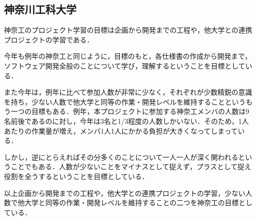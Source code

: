 \subsection{神奈川工科大学}
\par
神奈工のプロジェクト学習の目標は企画から開発までの工程や，他大学との連携プロジェクトの学習である．
\par
今年も例年の神奈工と同じように，目標のもと，各仕様書の作成から開発まで，ソフトウェア開発全般のことについて学び，理解するということを目標としている．
\par
また今年は，例年に比べて参加人数が非常に少なく，それぞれが少数精鋭の意識を持ち，少ない人数で他大学と同等の作業・開発レベルを維持することというもう一つの目標もある．例年，本プロジェクトに参加する神奈工メンバの人数は9名前後であるのに対し，今年は3名と1/3程度の人数しかいない．そのため，1人あたりの作業量が増え，メンバ1人1人にかかる負担が大きくなってしまっている．
\par
しかし，逆にとらえればその分多くのことについて一人一人が深く関われるということでもある．人数が少ないことをマイナスとして捉えず，プラスとして捉え役割を全うするということを目標としている．
\par
以上企画から開発までの工程や，他大学との連携プロジェクトの学習，少ない人数で他大学と同等の作業・開発レベルを維持することの二つを神奈工の目標としている．
